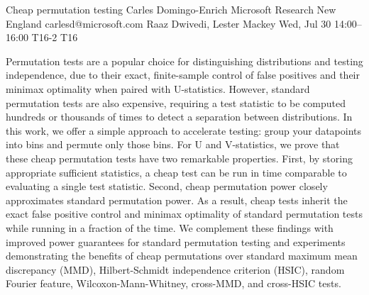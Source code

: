 \begin{talk}
  {Cheap permutation testing}%
  {Carles Domingo-Enrich}%
  {Microsoft Research New England}%
  {carlesd@microsoft.com}%
  {Raaz Dwivedi, Lester Mackey}%
  {}%
  {Wed, Jul 30 14:00–16:00}%
  {T16-2}%
  {T16}%
  
				
			
Permutation tests are a popular choice for distinguishing distributions and testing independence, due to their exact, finite-sample control of false positives and their minimax optimality when paired with U-statistics. However, standard permutation tests are also expensive, requiring a test statistic to be computed hundreds or thousands of times to detect a separation between distributions. In this work, we offer a simple approach to accelerate testing: group your datapoints into bins and permute only those bins. For U and V-statistics, we prove that these cheap permutation tests have two remarkable properties. First, by storing appropriate sufficient statistics, a cheap test can be run in time comparable to evaluating a single test statistic. Second, cheap permutation power closely approximates standard permutation power. As a result, cheap tests inherit the exact false positive control and minimax optimality of standard permutation tests while running in a fraction of the time. We complement these findings with improved power guarantees for standard permutation testing and experiments demonstrating the benefits of cheap permutations over standard maximum mean discrepancy (MMD), Hilbert-Schmidt independence criterion (HSIC), random Fourier feature, Wilcoxon-Mann-Whitney, cross-MMD, and cross-HSIC tests.



\end{talk}

